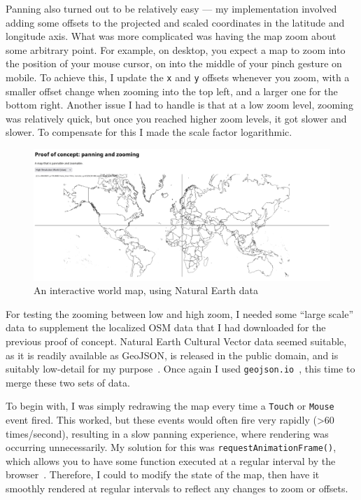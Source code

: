 \documentclass{final_report}
\begin{document}
Panning also turned out to be relatively easy --- my implementation involved adding some offsets to the projected and scaled coordinates in the latitude and longitude axis. What was more complicated was having the map zoom about some arbitrary point. For example, on desktop, you expect a map to zoom into the position of your mouse cursor, on into the middle of your pinch gesture on mobile. To achieve this, I update the \texttt{x} and \texttt{y} offsets whenever you zoom, with a smaller offset change when zooming into the top left, and a larger one for the bottom right. Another issue I had to handle is that at a low zoom level, zooming was relatively quick, but once you reached higher zoom levels, it got slower and slower. To compensate for this I made the scale factor logarithmic.

\begin{figure}[ht]
    \centering
    \includegraphics[width=\textwidth]{../proof-of-concepts/3-panning-and-zooming/screenshots/the-world.png}
    \caption{An interactive world map, using Natural Earth data~\cite{natural-earth}}\label{fig:panning-and-zooming}
\end{figure}

For testing the zooming between low and high zoom, I needed some ``large scale'' data to supplement the localized OSM data that I had downloaded for the previous proof of concept. Natural Earth Cultural Vector data seemed suitable, as it is readily available as GeoJSON, is released in the public domain, and is suitably low-detail for my purpose~\cite{natural-earth}. Once again I used \texttt{geojson.io}~\cite{geojson.io}, this time to merge these two sets of data.

To begin with, I was simply redrawing the map every time a \texttt{Touch} or \texttt{Mouse} event fired. This worked, but these events would often fire very rapidly (>60 times/second), resulting in a slow panning experience, where rendering was occurring unnecessarily. My solution for this was \texttt{requestAnimationFrame()}, which allows you to have some function executed at a regular interval by the browser~\cite{mdn-request-animation-frame}. Therefore, I could to modify the state of the map, then have it smoothly rendered at regular intervals to reflect any changes to zoom or offsets.
\end{document}
